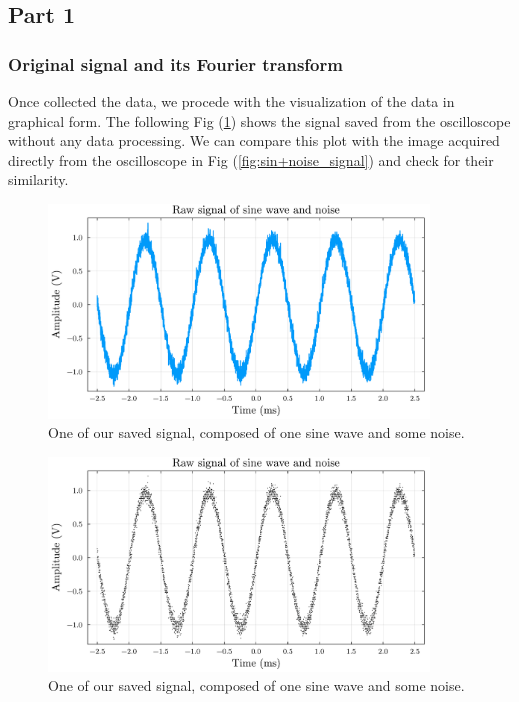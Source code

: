 \documentclass[a4paper,12pt]{article}
\begin{document}
\subsection{Part 1}
\subsubsection{Original signal and its Fourier transform}
\par Once collected the data, we procede with the visualization of the data 
in graphical form. The following Fig (\ref{plot:raw_signal_and_noise}) 
shows the signal saved from the oscilloscope without any data processing. 
We can compare this plot with the image acquired directly from the oscilloscope
in Fig (\ref{fig:sin+noise_signal}) and check for their similarity.
\begin{figure}[H]
    \centering
    \includegraphics[width=0.9\textwidth]{signal01.pdf}
    \caption{One of our saved signal, composed of one sine wave and some noise.}
    \label{plot:raw_signal_and_noise}
\end{figure}
\begin{figure}[H]
    \centering
    \includegraphics[width=0.9\textwidth]{signal01_scatter.pdf}
    \caption{One of our saved signal, composed of one sine wave and some noise.}
    \label{plot:raw_signal_and_noise_scatter}
\end{figure}
\end{document}
